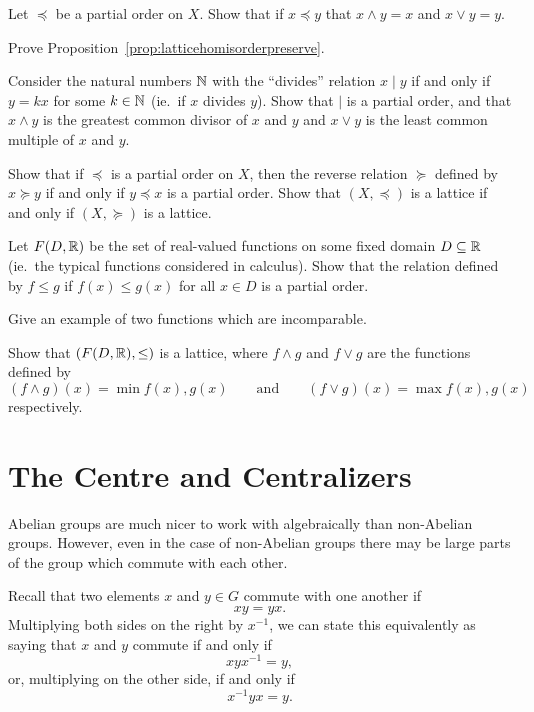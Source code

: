 \begin{exercises}
  \item\label{ex:orderfrommeetandjoin} Let $\preceq$ be a partial
    order on $X$.  Show that if $x \preceq y$ that $x \wedge y = x$ and
    $x \vee y = y$.
  
  \item\label{ex:latticehomisorderpreserve} Prove
    Proposition~\ref{prop:latticehomisorderpreserve}.
  
  \item Consider the natural numbers $\mathbb{N}$ with the ``divides''
    relation $x \mid y$ if and only if $y = kx$ for some $k \in \mathbb{N}$
    (ie.\ if $x$ divides $y$).  Show that $\mid$ is a partial order, and that
    $x \wedge y$ is the greatest common divisor of $x$ and $y$ and $x \vee y$
    is the least common multiple of $x$ and $y$.
  
  \item Show that if $\preceq$ is a partial order on $X$, then the reverse
    relation $\succeq$ defined by $x \succeq y$ if and only if $y \preceq x$ is
    a partial order.  Show that $(X, \preceq)$ is a lattice if and only if
    $(X, \succeq)$ is a lattice.
    
  \item Let $F(D, \mathbb{R})$ be the set of real-valued functions on some fixed
    domain $D \subseteq \mathbb{R}$ (ie.~the typical functions considered in calculus).
    Show that the relation defined by $f \le g$ if $f(x) \le g(x)$ for all
    $x \in D$ is a partial order.
    
    Give an example of two functions which are incomparable.
    
    Show that $(F(D, \mathbb{R}), \le)$ is a lattice, where $f \wedge g$ and
    $f \vee g$ are the functions defined by
    \[
      (f \wedge g)(x) = \min f(x), g(x) \qquad \text{and} \qquad
        (f \vee g)(x) = \max f(x), g(x)
    \]
    respectively.
\end{exercises}

\section{The Centre and Centralizers}

Abelian groups are much nicer to work with algebraically than non-Abelian
groups.  However, even in the case of non-Abelian groups there may be large
parts of the group which commute with each other.

Recall that two elements $x$ and $y \in G$ commute with one another if
\[
  xy = yx.
\]
Multiplying both sides on the right by $x^{-1}$, we can state this
equivalently as saying that $x$ and $y$ commute if and only if
\[
  xyx^{-1} = y,
\]
or, multiplying on the other side, if and only if
\[
  x^{-1}yx = y.
\]

